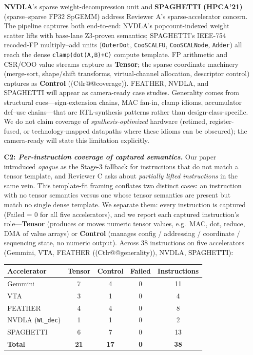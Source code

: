 \documentclass[sigconf, anonymous]{acmart}
\makeatletter
\newcommand{\cref}[1]{(C\csname tlr@@#1\endcsname)}
\newcommand{\clabel}[1]{} %
\makeatother
\begin{document}
\smallskip
\noindent
\textbf{NVDLA}'s sparse weight-decompression unit and \textbf{SPAGHETTI
(HPCA'21)} (sparse--sparse FP32 SpGEMM) address Reviewer A's
sparse-accelerator concern. The pipeline captures both end-to-end: NVDLA's popcount-indexed
weight scatter lifts with base-lane Z3-proven semantics; SPAGHETTI's
IEEE-754 recoded-FP multiply--add units (\texttt{OuterDot},
\texttt{CooSCALFU}, \texttt{CooSCALNode}, \texttt{Adder}) all reach the
dense \texttt{clamp(dot(A,B)+C)} compute template. FP arithmetic
and CSR/COO value streams capture as \textbf{Tensor}; the sparse
coordinate machinery (merge-sort, shape/shift transforms,
virtual-channel allocation, descriptor control) captures as
\textbf{Control} (\cref{coverage}). FEATHER, NVDLA, and SPAGHETTI will
appear as camera-ready case studies. Generality comes from structural
cues---sign-extension chains, MAC fan-in, clamp idioms, accumulator
def--use chains---that are RTL-synthesis patterns rather than
design-class-specific. We do not claim coverage of
\emph{synthesis-optimized} hardware (retimed, register-fused, or
technology-mapped datapaths where these idioms can be obscured); the
camera-ready will state this limitation explicitly.

\medskip
\noindent\textbf{C2: \emph{Per-instruction coverage of captured semantics.}}\clabel{coverage}
Our paper introduced \emph{opaque} as the Stage-3 fallback for instructions
that do not match a tensor template, and Reviewer C asks about
\emph{partially lifted instructions} in the same vein. This template-fit
framing conflates two distinct cases: an instruction with no tensor
semantics versus one whose tensor semantics are present but match no
single dense template. We separate them: every instruction is captured
(Failed = 0 for all five accelerators), and we report each captured
instruction's role---\textbf{Tensor} (produces or moves numeric tensor
values, e.g.\ MAC, dot, reduce, DMA of value arrays) or \textbf{Control}
(manages config / addressing / coordinate / sequencing state, no numeric
output). Across 38 instructions on five accelerators (Gemmini, VTA,
FEATHER (\cref{generality}), NVDLA, SPAGHETTI):

\smallskip
\noindent\begin{minipage}{\linewidth}\centering\scriptsize
\begin{tabular}{@{}lcccc@{}}
\toprule
Accelerator & Tensor & Control & Failed & Instructions \\
\midrule
Gemmini   & 7 & 4 & 0 & 11 \\
VTA       & 3 & 1 & 0 & 4  \\
FEATHER   & 4 & 4 & 0 & 8  \\
NVDLA (\texttt{WL\_dec}) & 1 & 1 & 0 & 2  \\
SPAGHETTI & 6 & 7 & 0 & 13 \\
\midrule
\textbf{Total} & \textbf{21} & \textbf{17} & \textbf{0} & \textbf{38} \\
\bottomrule
\end{tabular}
\end{minipage}
\smallskip
\end{document}
